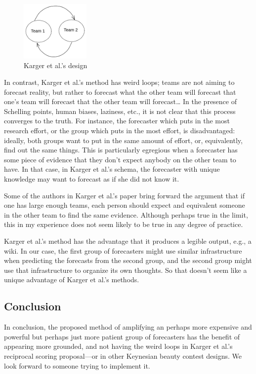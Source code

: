 \documentclass[]{article}
\begin{document}
\begin{figure}
\centering
\includegraphics[width=0.3\textwidth,height=\textheight]{diagrams/karger-method.png}
\caption{Karger et al.'s design}
\end{figure}

In contrast, Karger et al.'s method has weird loops; teams are not
aiming to forecast reality, but rather to forecast what the other team
will forecast that one's team will forecast that the other team will
forecast\ldots{} In the presence of Schelling points, human biases,
laziness, etc., it is not clear that this process converges to the
truth. For instance, the forecaster which puts in the most research
effort, or the group which puts in the most effort, is disadvantaged:
ideally, both groups want to put in the same amount of effort, or,
equivalently, find out the same things. This is particularly egregious
when a forecaster has some piece of evidence that they don't expect
anybody on the other team to have. In that case, in Karger et al.'s
schema, the forecaster with unique knowledge may want to forecast as if
she did not know it.

Some of the authors in Karger et al.'s paper bring forward the argument
that if one has large enough teams, each person should expect and
equivalent someone in the other team to find the same evidence. Although
perhaps true in the limit, this in my experience does not seem likely to
be true in any degree of practice.

Karger et al.'s method has the advantage that it produces a legible
output, e.g., a wiki. In our case, the first group of forecasters might
use similar infrastructure when predicting the forecasts from the second
group, and the second group might use that infrastructure to organize
its own thoughts. So that doesn't seem like a unique advantage of Karger
et al.'s methods.

\hypertarget{conclusion}{%
\subsection{Conclusion}\label{conclusion}}

In conclusion, the proposed method of amplifying an perhaps more
expensive and powerful but perhaps just more patient group of
forecasters has the benefit of appearing more grounded, and not having
the weird loops in Karger et al.'s reciprocal scoring proposal---or in
other Keynesian beauty contest designs. We look forward to someone
trying to implement it.
\end{document}
